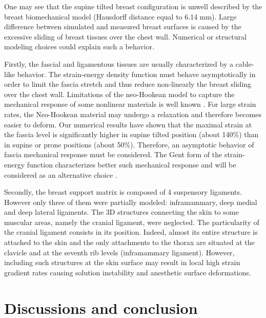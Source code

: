 One may see that the supine tilted breast configuration is unwell described by the breast biomechanical model (Hausdorff distance equal to 6.14 mm). Large difference between simulated and measured breast surfaces is caused by the excessive sliding of breast tissues over the chest wall. Numerical or structural modeling choices could explain such a behavior.

Firstly, the fascial and ligamentous tissues are usually characterized by a cable-like behavior. The strain-energy density function must behave asymptotically in order to limit the fascia stretch and thus reduce non-linearly the breast sliding over the chest wall. Limitations of the neo-Hookean model to capture the mechanical response of some nonlinear materials is well known \citep{kaliske_finite_1997}. For large strain rates, the Neo-Hookean material may undergo a relaxation and therefore becomes easier to deform.  Our numerical results have shown that the maximal strain at the fascia level is significantly higher in supine tilted position (about 140\%) than in supine or prone positions (about 50\%).  Therefore, an asymptotic behavior of fascia mechanical response must be considered.  The Gent  form of the strain-energy function characterizes better such mechanical response \citep{gent_new_1996} and will be considered as an alternative choice .

Secondly, the breast support matrix is composed of 4 suspensory ligaments. However only three of them were partially modeled: inframammary, deep medial and deep lateral ligaments. The 3D structures connecting the skin to some muscular areas, namely the cranial ligament,  were neglected.  The particularity  of the cranial ligament consists in its position. Indeed,  almost its entire structure is attached to the skin and the only attachments to the thorax are situated at the clavicle and at the seventh rib levels (inframammary ligament). However, including such structures at the skin surface may result in local high strain gradient rates causing solution instability and anesthetic surface deformations. 


\section{Discussions and conclusion} \label{section:validation:discutionconclusion}


